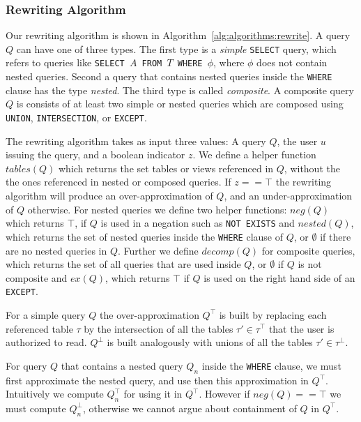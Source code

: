 \subsubsection{Rewriting Algorithm}
%
Our rewriting algorithm is shown in Algorithm~\ref{alg:algorithms:rewrite}.
%
A query $Q$ can have one of three types.
%
The first type is a \emph{simple} \texttt{SELECT} query, which refers to queries like \texttt{SELECT $A$ FROM $T$ WHERE $\phi$}, where $\phi$ does not contain nested queries.
%
Second a query that contains nested queries inside the \texttt{WHERE} clause has the type \emph{nested}.
%
The third type is called \emph{composite}.
%
A composite query $Q$ is consists of at least two simple or nested queries which are composed using \texttt{UNION}, \texttt{INTERSECTION}, or \texttt{EXCEPT}.

The rewriting algorithm takes as input three values: A query $Q$, the user $u$ issuing the query, and a boolean indicator $z$.
%
We define a helper function $\mathit{tables}(Q)$ which returns the set tables or views referenced in $Q$, without the the ones referenced in nested or composed queries.
%
If $z == \top$ the rewriting algorithm will produce an over-approximation of $Q$, and an under-approximation of $Q$ otherwise.
%
For nested queries we define two helper functions: $\mathit{neg}(Q)$ which returns $\top$, if $Q$ is used in a negation such as \texttt{NOT EXISTS} and $\mathit{nested}(Q)$, which returns the set of nested queries inside the \texttt{WHERE} clause of $Q$, or $\emptyset$ if there are no nested queries in $Q$.
%
Further we define $\mathit{decomp}(Q)$ for composite queries, which returns the set of all queries that are used inside $Q$, or $\emptyset$ if $Q$ is not composite and $\mathit{ex}(Q)$, which returns $\top$ if $Q$ is used on the right hand side of an \texttt{EXCEPT}.

For a simple query $Q$ the over-approximation $Q^\top$ is built by replacing each referenced table $\tau$ by the intersection of all the tables $\tau' \in \tau^\top$ that the user is authorized to read.
%
$Q^\bot$ is built analogously with unions of all the tables $\tau' \in \tau^\bot$.

For query $Q$ that contains a nested query $Q_n$ inside the \texttt{WHERE} clause, we must first approximate the nested query, and use then this approximation in $Q^\top$.
%
Intuitively we compute $Q_n^\top$ for using it in $Q^\top$.
%
However if $neg(Q) == \top$ we must compute $Q_n^\bot$, otherwise we cannot argue about containment of $Q$ in $Q^\top$.

